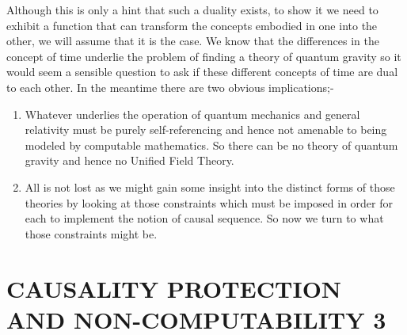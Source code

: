 \documentclass[
   ,final            %
  ]
  {aipproc}
\begin{document}
\par
Although this is only a hint that such a duality exists, to show it we need to exhibit a function that can transform the concepts embodied in one into %
the other, we will assume that it is the case. We know that the differences in the concept of time underlie the problem of finding a theory of quantum %
gravity so it would seem a sensible question to ask if these different concepts of time are dual to each other. In the meantime there are two obvious %
implications;-
\begin{enumerate}[(1)]
\item
Whatever underlies the operation of quantum mechanics and general
relativity must be purely self-referencing and hence not amenable to being modeled by computable mathematics. So there can be no theory of quantum %
gravity and hence no Unified Field Theory. 
\item
All is not lost as we might gain some insight into the distinct forms of those theories by looking at those constraints which must be imposed in order %
for each to implement the notion of causal sequence. So now we turn to what those constraints might be.
\end{enumerate}
\section{CAUSALITY PROTECTION AND NON-COMPUTABILITY 3}
\end{document}
